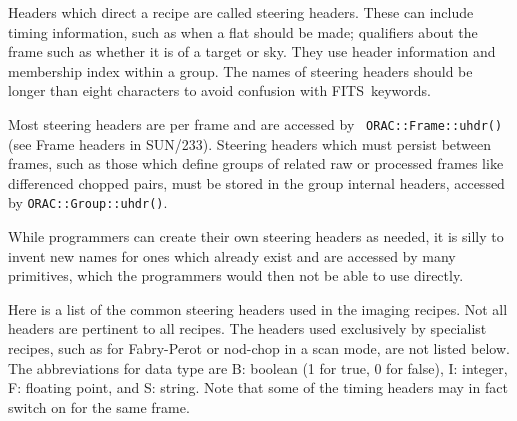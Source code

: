\documentclass[twoside,11pt]{article}
\newcommand{\htmladdnormallink}[2]{#1}
\newcommand{\xref}[3]{#1}
\renewcommand{\_}{\texttt{\symbol{95}}}
\newcommand{\FITSref}{\htmladdnormallink{FITS}{http://fits.gsfc.nasa.gov/}}
\begin{document}
Headers which direct a recipe are called steering headers.  These can
include timing information, such as when a flat should be made;
qualifiers about the frame such as whether it is of a target or sky.
They use header information and membership index within a group.
The names of steering headers should be longer than eight characters
to avoid confusion with \FITSref\ keywords.

Most steering headers are per frame and are accessed by {\tt
ORAC::Frame::uhdr()} (see \xref{Frame headers in SUN/233}{sun233}{}).
Steering headers which must persist between frames, such as those
which define groups of related raw or processed frames like
differenced chopped pairs, must be stored in the group internal
headers, accessed by {\tt ORAC::Group::uhdr()}.

While programmers can create their own steering headers as needed, it
is silly to invent new names for ones which already exist and are
accessed by many primitives, which the programmers would then not be
able to use directly.

Here is a list of the common steering headers used in the imaging
recipes.  Not all headers are pertinent to all recipes.  The headers
used exclusively by specialist recipes, such as for Fabry-Perot or
nod-chop in a scan mode, are not listed below.  The abbreviations for
data type are B: boolean (1 for true, 0 for false), I: integer, F:
floating point, and S: string.  Note that some of the timing headers
may in fact switch on for the same frame.
\end{document}
